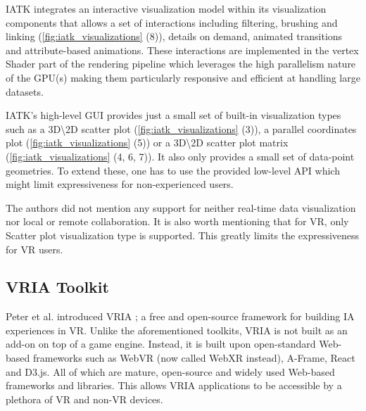 \documentclass{vgtc}                          %
\begin{document}
\smallskip

\noindent IATK integrates an interactive visualization model within its
visualization components that allows a set of interactions including filtering,
brushing and linking (\autoref{fig:iatk_visualizations} (8)), details on demand,
animated transitions and attribute-based animations. These interactions are
implemented in the vertex Shader part of the rendering pipeline which leverages
the high parallelism nature of the GPU(s) making them particularly responsive
and efficient at handling large datasets.

\smallskip

\noindent IATK's high-level GUI provides just a small set of built-in visualization
types such as a 3D\textbackslash2D scatter plot (\autoref{fig:iatk_visualizations}
(3)), a parallel coordinates plot (\autoref{fig:iatk_visualizations} (5)) or a
3D\textbackslash2D scatter plot matrix (\autoref{fig:iatk_visualizations} (4, 6, 7)).
It also only provides a small set of data-point geometries. To extend these,
one has to use the provided low-level API which might limit expressiveness for
non-experienced users.

\smallskip

\noindent The authors did not mention any support for neither real-time data
visualization nor local or remote collaboration. It is also worth mentioning
that for VR, only Scatter plot visualization type is supported. This greatly
limits the expressiveness for VR users.

\subsection{VRIA Toolkit}
Peter et al. introduced VRIA \cite{vria_framework}; a free and open-source \cite{vria:repo}
framework for building IA experiences in VR. Unlike the aforementioned
toolkits, VRIA is not built as an add-on on top of a game engine. Instead, it is
built upon open-standard Web-based frameworks such as WebVR (now called WebXR instead), A-Frame, React and
D3.js. All of which are mature, open-source and widely used Web-based
frameworks and libraries. This allows VRIA applications to be accessible by a
plethora of VR and non-VR devices.
\end{document}
